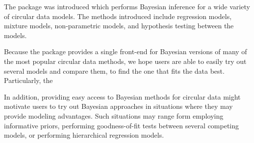 The  package  was introduced which performs
Bayesian inference for a wide variety of circular data models. The
methods introduced include regression models, mixture models,
non-parametric models, and hypothesis testing between the models.

Because the package provides a single front-end for Bayesian versions of
many of the most popular circular data methods, we hope users are able
to easily try out several models and compare them, to find the one that
fits the data best. Particularly, the

In addition, providing easy access to Bayesian methods for circular data
might motivate users to try out Bayesian approaches in situations where
they may provide modeling advantages. Such situations may range form
employing informative priors, performing goodness-of-fit tests between
several competing models, or performing hierarchical regression models.

